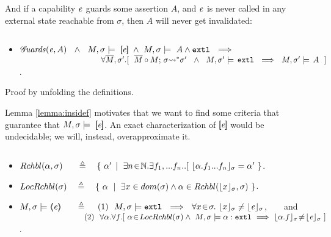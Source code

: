 \documentclass[acmsmall,review,anonymous,screen]{acmart}\settopmatter{printfolios=true,printacmref=false}
\begin{document}
And if a capability $\mathit{e}$ guards some assertion $A$, and $\mathit{e}$ is never called in any external  state reachable from $\sigma$, then $A$ will never get invalidated:

\begin{lemma}
$~ $ \\
\label{lemma:insidef}
\begin{itemize}

\item
$ {\mathcal G}\!\mathit{uards}( {\mathit{e}}, {A}) \ \ \wedge\ \ M, \sigma \models \  [\!\![ \mathit{e} ]\!\!] \ \wedge \  M, \sigma \models \  A \wedge \mbox{\normalfont{\texttt{extl}}} \ \ \Longrightarrow $\\
$\strut \hspace{3.6cm}\forall \Mtwo,  \sigma'.[\ \   \leadstoBoundedStar  {\Mtwo\circ M} {\sigma} {\sigma'}\ \ \wedge\ \ M, \sigma' \models \,  \extThis  \ \  \Longrightarrow\ \ M, \sigma' \models\,  A \ \ ]$.
\end{itemize}
\end{lemma}

Proof by unfolding the definitions. 
 
 \vspace{.3cm}
 Lemma \ref{lemma:insidef} motivates that we want to find some criteria that guarantee that $M, \sigma \models \  [\!\![ \mathit{e} ]\!\!]$.
 An exact characterization of $ [\!\![ \mathit{e} ]\!\!]$ would be undecidable; we will, instead, overapproximate it.
 
\begin{definition}
$~ \ $

\begin{itemize}

\item
{{$\Relevant {\alpha} {\sigma}  \ \ \ \ \ \triangleq \ \  \  \{ \ \alpha' \, \mid \ \exists n\!\in\!\mathbb{N}.\exists f_1,...f_n.. [\ \interpret {\sigma} {\alpha.f_1...f_n} = \alpha'\ \}$}}.

\item
$ \LRelevantO   \sigma  \ \  \ \triangleq \ \  \  \{ \ \alpha \ \mid \ { \exists x\in dom(\sigma) \wedge \alpha \in \Relevant {\interpret  {\sigma} x}
{\sigma} \ \} } $.

\item
\label{sect:semantics:assert:prt}
$\satisfiesA{M}{\sigma} {\inside {\re}}  \ \ \ \  \ \triangleq \ \ \   $
 $(1)\ \ \satisfiesA{M}{\sigma}{\extThis}\ \ \Longrightarrow\ \ \forall x\!\in\! \sigma.\ \interpret \sigma x  \neq \interpret \sigma \re $,\ \ \ \ and 
\\
$~\strut  \hspace{2.7cm} (2) \ \ \forall \alpha.\forall f.[\ \alpha\!\in\!{LocRchbl(\sigma)} \wedge\   M , \sigma \models \alpha:\mbox{\normalfont{\texttt{extl}}} 
  \ \Longrightarrow \  
  \lfloor \alpha.f \rfloor_{\sigma}\! \neq \! \lfloor \mathit{e} \rfloor_{\sigma}     \ ] $.

\end{itemize}

\end{definition}
\end{document}

